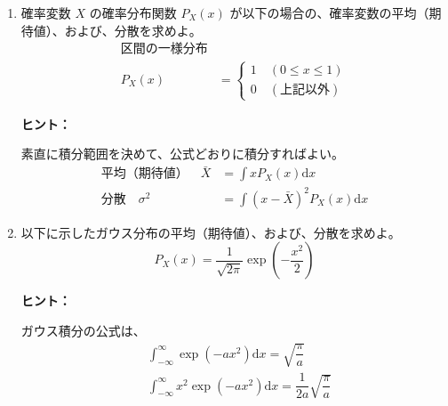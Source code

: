 \documentclass[uplatex,dvipdfmx,a4paper,11pt]{jsarticle}
\newcommand{\diff}{\mathrm d}
\begin{document}
\begin{enumerate}
\setlength{\parskip}{0cm} %
\setlength{\itemsep}{0.5cm} %

\item
確率変数 $X$ の確率分布関数 $P_X(x)$ が以下の場合の、確率変数の平均（期待値）、および、分散を求めよ。
\begin{align*}
[0,1] \text{区間の一様分布}& \\
P_X(x) &=
\begin{cases}
1 \quad (0 \leq x \leq 1)　\\
0 \quad (\text{上記以外})
\end{cases}
\end{align*}

\begin{itembox}[l]{{\bf ヒント：}}

素直に積分範囲を決めて、公式どおりに積分すればよい。
\begin{align*}
平均（期待値）\quad \bar{X} &= \displaystyle \int x P_X(x) \diff x \\
分散 \quad \sigma^2 &= \displaystyle \int \left(x-\bar{X} \right)^2 P_X(x) \diff x
\end{align*}

\end{itembox}



\item
以下に示したガウス分布の平均（期待値）、および、分散を求めよ。
\begin{equation*}
P_X(x) = \dfrac{1}{\sqrt{2 \pi}} \exp \left(-\dfrac{x^2}{2} \right)
\end{equation*}

\begin{itembox}[l]{{\bf ヒント：}}

ガウス積分の公式は、
\begin{align*}
&\int_{-\infty}^{\infty} \exp(-ax^2) \diff x = \sqrt{\dfrac{\pi}{a}} \\
&\int_{-\infty}^{\infty} x^2 \exp(-ax^2) \diff x = \dfrac{1}{2a} \sqrt{\dfrac{\pi}{a}}
\end{align*}

\end{itembox}

\end{enumerate}

\newpage
\end{document}
